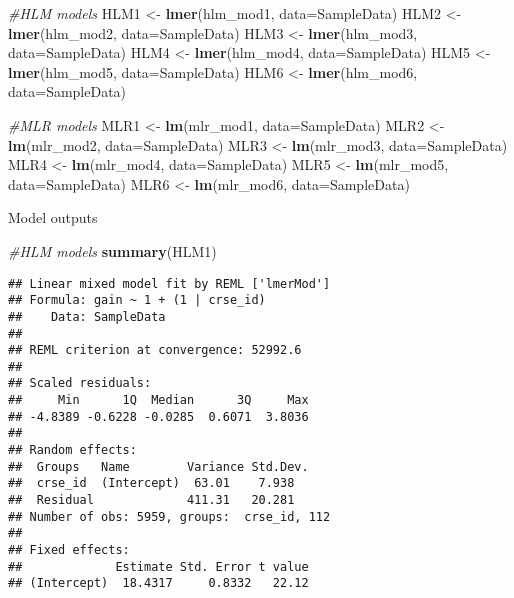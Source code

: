 \documentclass[]{article}
\newenvironment{Shaded}{\begin{snugshade}}{\end{snugshade}}
\newcommand{\KeywordTok}[1]{\textcolor[rgb]{0.13,0.29,0.53}{\textbf{#1}}}
\newcommand{\DataTypeTok}[1]{\textcolor[rgb]{0.13,0.29,0.53}{#1}}
\newcommand{\StringTok}[1]{\textcolor[rgb]{0.31,0.60,0.02}{#1}}
\newcommand{\CommentTok}[1]{\textcolor[rgb]{0.56,0.35,0.01}{\textit{#1}}}
\newcommand{\NormalTok}[1]{#1}
\begin{document}
\begin{Shaded}
\begin{Highlighting}[]
\CommentTok{#HLM models}
\NormalTok{HLM1 <-}\StringTok{ }\KeywordTok{lmer}\NormalTok{(hlm_mod1, }\DataTypeTok{data=}\NormalTok{SampleData)}
\NormalTok{HLM2 <-}\StringTok{ }\KeywordTok{lmer}\NormalTok{(hlm_mod2, }\DataTypeTok{data=}\NormalTok{SampleData)}
\NormalTok{HLM3 <-}\StringTok{ }\KeywordTok{lmer}\NormalTok{(hlm_mod3, }\DataTypeTok{data=}\NormalTok{SampleData)}
\NormalTok{HLM4 <-}\StringTok{ }\KeywordTok{lmer}\NormalTok{(hlm_mod4, }\DataTypeTok{data=}\NormalTok{SampleData)}
\NormalTok{HLM5 <-}\StringTok{ }\KeywordTok{lmer}\NormalTok{(hlm_mod5, }\DataTypeTok{data=}\NormalTok{SampleData)}
\NormalTok{HLM6 <-}\StringTok{ }\KeywordTok{lmer}\NormalTok{(hlm_mod6, }\DataTypeTok{data=}\NormalTok{SampleData)}

\CommentTok{#MLR models}
\NormalTok{MLR1 <-}\StringTok{ }\KeywordTok{lm}\NormalTok{(mlr_mod1, }\DataTypeTok{data=}\NormalTok{SampleData)}
\NormalTok{MLR2 <-}\StringTok{ }\KeywordTok{lm}\NormalTok{(mlr_mod2, }\DataTypeTok{data=}\NormalTok{SampleData)}
\NormalTok{MLR3 <-}\StringTok{ }\KeywordTok{lm}\NormalTok{(mlr_mod3, }\DataTypeTok{data=}\NormalTok{SampleData)}
\NormalTok{MLR4 <-}\StringTok{ }\KeywordTok{lm}\NormalTok{(mlr_mod4, }\DataTypeTok{data=}\NormalTok{SampleData)}
\NormalTok{MLR5 <-}\StringTok{ }\KeywordTok{lm}\NormalTok{(mlr_mod5, }\DataTypeTok{data=}\NormalTok{SampleData)}
\NormalTok{MLR6 <-}\StringTok{ }\KeywordTok{lm}\NormalTok{(mlr_mod6, }\DataTypeTok{data=}\NormalTok{SampleData)}
\end{Highlighting}
\end{Shaded}

Model outputs

\begin{Shaded}
\begin{Highlighting}[]
\CommentTok{#HLM models}
\KeywordTok{summary}\NormalTok{(HLM1)}
\end{Highlighting}
\end{Shaded}

\begin{verbatim}
## Linear mixed model fit by REML ['lmerMod']
## Formula: gain ~ 1 + (1 | crse_id)
##    Data: SampleData
## 
## REML criterion at convergence: 52992.6
## 
## Scaled residuals: 
##     Min      1Q  Median      3Q     Max 
## -4.8389 -0.6228 -0.0285  0.6071  3.8036 
## 
## Random effects:
##  Groups   Name        Variance Std.Dev.
##  crse_id  (Intercept)  63.01    7.938  
##  Residual             411.31   20.281  
## Number of obs: 5959, groups:  crse_id, 112
## 
## Fixed effects:
##             Estimate Std. Error t value
## (Intercept)  18.4317     0.8332   22.12
\end{verbatim}
\end{document}
